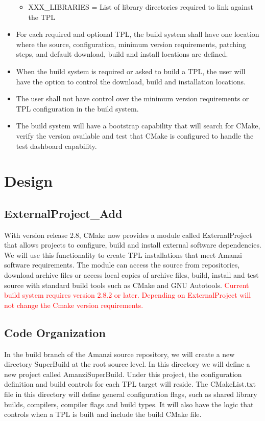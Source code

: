 \documentclass[12pt]{article}
\begin{document}
\begin{itemize}
\begin{itemize}
\item XXX\_LIBRARIES = List of library directories required to link against the TPL
\end{itemize}
\item For each required and optional TPL, the build system shall have one location where the source, configuration,
          minimum version requirements, patching steps, and default download, build and install locations are defined.
\item When the build system is required or asked to build a TPL, the user will have the option to control the download,
          build and installation locations.
\item The user shall not have control over the minimum version requirements or TPL configuration in the build system.
\item  The build system will have a bootstrap capability that will search for CMake, verify the version available and test 
           that CMake is configured to handle the test dashboard capability.                   
                            
\end{itemize}

\section{Design}

\subsection{ExternalProject\_Add}
With version release 2.8, CMake now provides a module called ExternalProject that allows projects to configure, build
and install external software dependencies. We will use this functionality to create TPL installations that meet Amanzi
software requirements. The module can access the source from repositories, download archive files or access local copies 
of archive files, build, install and test source with standard build tools such as CMake and GNU Autotools. 
\textcolor{red}{Current build system requires version 2.8.2 or later. Depending on ExternalProject will not change the
Cmake version requirements.}

\subsection{Code Organization}
In the build branch of the Amanzi source repository, we will create a new directory {SuperBuild} at the root source level.
In this directory we will define a new project called {AmanziSuperBuild}. Under this project,  the configuration definition
and build controls for each TPL target will reside. The CMakeList.txt file in this directory will define general configuration
flags, such as shared library builds, compilers, compiler flags and build types. It will also have the logic that controls
when a TPL is built and include the build CMake file.
\end{document}
